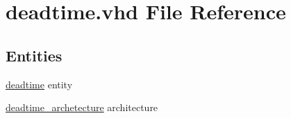 \hypertarget{deadtime_8vhd}{}\section{deadtime.\+vhd File Reference}
\label{deadtime_8vhd}
\subsection*{Entities}
\begin{DoxyCompactItemize}
\item 
\hyperlink{classdeadtime}{deadtime} entity
\item 
\hyperlink{classdeadtime_1_1deadtime__archetecture}{deadtime\+\_\+archetecture} architecture
\end{DoxyCompactItemize}
